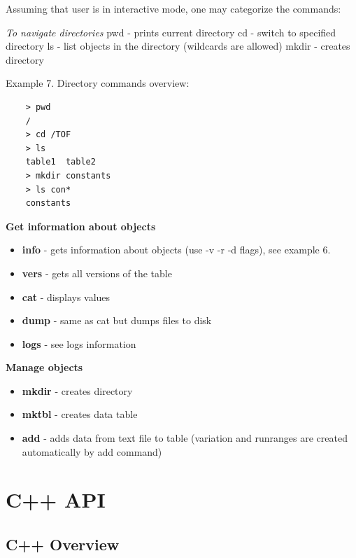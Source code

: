 \documentclass{article}
\begin{document}
Assuming that user is in interactive mode, one may categorize the commands:


\emph{To navigate directories}
pwd - prints current directory
cd  - switch to specified directory
ls  - list objects in the directory (wildcards are allowed)
mkdir - creates directory

Example 7. Directory commands overview:
\begin{verbatim}
    > pwd
    /
	> cd /TOF
	> ls
    table1  table2
	> mkdir constants
	> ls con*
    constants
\end{verbatim}



\textbf{Get information about objects}
\begin{itemize}
  \item \textbf{info} - gets information about objects (use -v -r -d flags), 
  see example 6.
  \item \textbf{vers} - gets all versions of the table
  \item \textbf{cat}  - displays values
  \item \textbf{dump} - same as cat but dumps files to disk
  \item \textbf{logs} - see logs information
\end{itemize}


\textbf{Manage objects}
\begin{itemize}
  \item \textbf{mkdir} - creates directory
  \item \textbf{mktbl} - creates data table
  \item \textbf{add} - adds data from text file to table
        (variation and runranges are created automatically by add command)
\end{itemize}

\newpage
\section{C++ API}\label{sec:cpp}


\subsection{C++ Overview}
\end{document}
